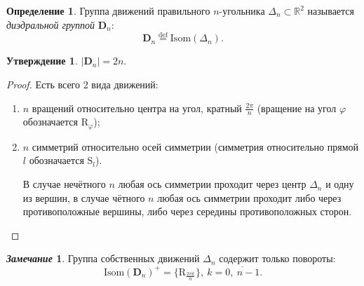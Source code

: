 \documentclass[a4paper, 14pt]{extarticle}
\newcommand{\deq}{\stackrel{\mathrm{def}}{=}}
\newcommand{\n}{\par}
\newcommand{\real}{\mathbb{R}}
\newcommand{\dihedral}{\mathbf{D}}
\newcommand{\Isom}{\mathrm{Isom}}
\newcommand{\Rot}{\mathrm{R}}
\newcommand{\Sym}{\mathrm{S}}
\renewcommand{\phi}{\varphi}
\theoremstyle{definition}
\newtheorem*{remark}{\textit{Замечание}}
\newtheorem{definition}{Определение}
\theoremstyle{plain}
\numberwithin{theorem}{section}
\numberwithin{definition}{section}
\newtheorem{statement}{Утверждение}
\numberwithin{statement}{section}
\numberwithin{lemma}{section}
\numberwithin{consequence}{section}
\begin{document}
	\newpage
	\begin{definition}
		Группа движений правильного $n$-угольника ${\Delta_n \subset \real^2}$ называется \textit{диэдральной группой} $\dihedral_n{:}$
		\begin{equation*}
			\dihedral_n \deq \Isom(\Delta_n).
		\end{equation*}
	\end{definition}
	\begin{statement}
		${|\dihedral_n| = 2n.}$
	\end{statement}
        \begin{proof}
            Есть всего 2 вида движений:
		\begin{enumerate}
			\setlength\itemsep{0.1em}
			\item $n$ вращений относительно центра на угол, кратный $\frac{2\pi}{n}$ (вращение на угол $\phi$ обозначается $\Rot_\phi$);
			\item $n$ симметрий относительно осей симметрии (симметрия относительно прямой $l$ обозначается $\Sym_l$). \n В случае нечётного $n$ любая ось симметрии проходит через центр $\Delta_n$ и одну из вершин, в случае чётного $n$ любая ось симметрии проходит либо через противоположные вершины, либо через середины противоположных сторон. \qedhere
		\end{enumerate}
        \end{proof}
	\begin{remark}
		Группа собственных движений $\Delta_n$ содержит только повороты:
		\begin{equation*}
			\Isom(\dihedral_n)^+ = \{\Rot_{\frac{2\pi k}{n}}\}, \ k = \overline{0, \ n - 1}.
		\end{equation*}
	\end{remark}
\end{document}
